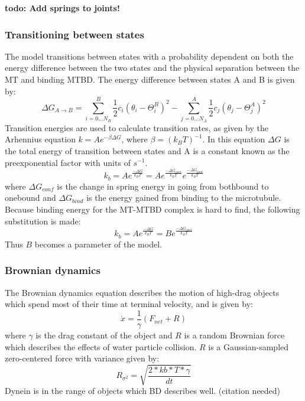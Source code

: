 \documentclass[10pt]{article} %
\begin{document}
\textbf{todo: Add springs to joints!}

\subsubsection{Transitioning between states}
The model transitions between states with a probability dependent on both the energy difference between the two states and the physical separation between the MT and binding MTBD. The energy difference between states A and B is given by:
%
\begin{equation}
  \Delta G_{A\rightarrow B} = \sum_{i=0...N_B}^{B} \frac{1}{2}c_i\left(\theta_i-\Theta_i^B\right)^2 - \sum_{j=0...N_A}^{A} \frac{1}{2}c_j\left(\theta_j-\Theta_j^A\right)^2
\end{equation}
%
Transition energies are used to calculate transition rates, as given by the Arhennius equation $k=Ae^{-\beta\Delta G}$, where $\beta = (k_BT)^{-1}$. In this equation $\Delta G$ is the total energy of transition between states and A is a constant known as the preexponential factor with units of $s^{-1}$.\\
%
\begin{equation}
  k_b = Ae^{\frac{-\Delta G}{k_BT}} = Ae^{\frac{-\Delta G_{conf}}{k_BT}}e^{\frac{-\Delta G_{bind}}{k_BT}}
\end{equation}
%
where $\Delta G_{conf}$ is the change in spring energy in going from bothbound to onebound and $\Delta G_{bind}$ is the energy gained from binding to the microtubule. Because binding energy for the MT-MTBD complex is hard to find, the following substitution is made:
%
\begin{equation}
  k_b = Ae^{\frac{-\Delta G}{k_BT}} = Be^{\frac{-\Delta G_{conf}}{k_BT}}
\end{equation}
%
Thus $B$ becomes a parameter of the model.\\

\subsubsection{Brownian dynamics}
The Brownian dynamics equation describes the motion of high-drag objects which spend most of their time at terminal velocity, and is given by:
%
\begin{equation}
  \dot{x} = \frac{1}{\gamma}\left(F_{net} + R\right)
\end{equation}
%
where $\gamma$ is the drag constant of the object and $R$ is a random Brownian force which describes the effects of water particle collision. $R$ is a Gaussian-sampled zero-centered force with variance given by:
%
\begin{equation}
  R_{\sigma^2} = \sqrt{\frac{2*kb*T*\gamma}{dt}}
\end{equation}
%
Dynein is in the range of objects which BD describes well. (citation needed)
\end{document}
